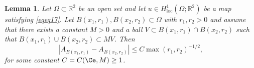 \documentclass[12pt]{article}
\newtheorem{lemma}[theorem]{Lemma}
\theoremstyle{definition}
\theoremstyle{remark}
\numberwithin{equation}{section}
\newcommand{\R}{\mathbb{R}}
\begin{document}
\begin{lemma}\label{LemmaMovRig}
    Let $\Omega\subset\R^2$ be an open set and let $u\in H^1_{\mathrm{loc}}(\Omega;\R^2)$ be a map satisfying \eqref{eqeq17}.
    Let $B(x_1,r_1),B(x_2,r_2)\subset\Omega$ with $r_1,r_2>0$ and assume that there exists a constant $M>0$ and a ball $V\subset B(x_1,r_1)\cap B(x_2,r_2)$ such that $B(x_1,r_1)\cup B(x_2,r_2)\subset MV$.
    Then
    \begin{equation}
        |A_{B(x_1,r_1)}-A_{B(x_2,r_2)}|\leq C \max(r_1,r_2)^{-1/2},
    \end{equation}
    for some constant $C=C(\Ce,M) \geq 1$.
\end{lemma}
\end{document}

